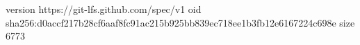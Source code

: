 version https://git-lfs.github.com/spec/v1
oid sha256:d0accf217b28cf6aaf8fc91ac215b925bb839ec718ee1b3fb12e6167224c698e
size 6773
